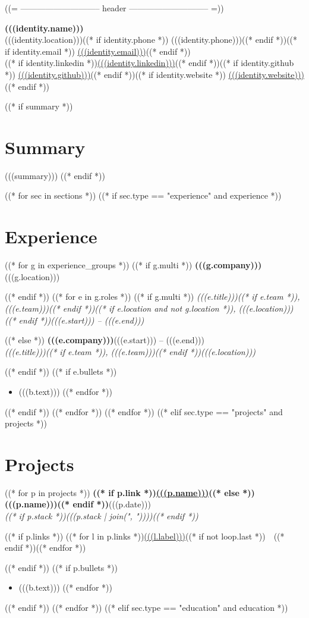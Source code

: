 \documentclass[10pt,letterpaper]{article}
\newcommand{\employer}[2]{%
  \noindent\textbf{#1}\hfill #2\par
}
\newcommand{\role}[2]{%
  \noindent\textit{#1}\hfill\textit{#2}\par
}
\newcommand{\entry}[4]{%
  \noindent\textbf{#1}\hfill #2\\
  \textit{#3}\hfill\textit{#4}\par
}
\begin{document}
\small

((= ----------------------------- header ----------------------------- =))
\begin{center}
  {\Large\bfseries (((identity.name)))}\\[1pt]
  (((identity.location)))((* if identity.phone *)) \textbar{} (((identity.phone)))((* endif *))((* if identity.email *)) \textbar{} \href{mailto:(((identity.email_raw)))}{(((identity.email)))}((* endif *))\\
  ((* if identity.linkedin *))\href{(((identity.linkedin_raw)))}{(((identity.linkedin)))}((* endif *))((* if identity.github *)) \textbar{} \href{(((identity.github_raw)))}{(((identity.github)))}((* endif *))((* if identity.website *)) \textbar{} \href{(((identity.website_raw)))}{(((identity.website)))}((* endif *))
\end{center}

((* if summary *))
\section{Summary}
(((summary)))
((* endif *))

((* for sec in sections *))
((* if sec.type == "experience" and experience *))
\section{Experience}
((* for g in experience_groups *))
((* if g.multi *))
\employer{(((g.company)))}{(((g.location)))}
((* endif *))
((* for e in g.roles *))
((* if g.multi *))
\role{(((e.title)))((* if e.team *)), (((e.team)))((* endif *))((* if e.location and not g.location *)), (((e.location)))((* endif *))}{(((e.start))) -- (((e.end)))}
((* else *))
\entry{(((e.company)))}{(((e.start))) -- (((e.end)))}{(((e.title)))((* if e.team *)), (((e.team)))((* endif *))}{(((e.location)))}
((* endif *))
((* if e.bullets *))
\begin{itemize}
((* for b in e.bullets *))
  \item (((b.text)))
((* endfor *))
\end{itemize}
((* endif *))
((* endfor *))
((* endfor *))
((* elif sec.type == "projects" and projects *))
\section{Projects}
((* for p in projects *))
\entry{((* if p.link *))\href{(((p.link_raw)))}{(((p.name)))}((* else *))(((p.name)))((* endif *))}{(((p.date)))}{((* if p.stack *))(((p.stack | join(", "))))((* endif *))}{}
((* if p.links *))
\noindent((* for l in p.links *))\href{(((l.url_raw)))}{(((l.label)))}((* if not loop.last *))~\textperiodcentered~((* endif *))((* endfor *))\par
((* endif *))
((* if p.bullets *))
\begin{itemize}
((* for b in p.bullets *))
  \item (((b.text)))
((* endfor *))
\end{itemize}
((* endif *))
((* endfor *))
((* elif sec.type == "education" and education *))
\end{document}
